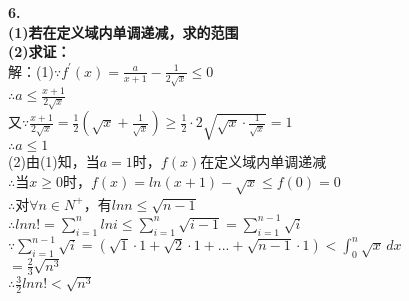 \documentclass{article}
\begin{document}
    \newpage
    \noindent \textbf{6. \\
    (1)若在定义域内单调递减，求的范围 \\
    (2)求证：} \\
    解：(1)\quad $\because $\quad $f^{'}(x)=\frac{a}{x+1}-\frac{1}{2\sqrt{x}}\leqslant 0$ \\
    $\therefore $\quad $a\leqslant \frac{x+1}{2\sqrt{x}}$ \\
    又$\because $\quad $\frac{x+1}{2\sqrt{x}}=\frac{1}{2}\left(\sqrt{x}+\frac{1}{\sqrt{x}}\right)\geqslant \frac{1}{2}\cdot 2\sqrt{\sqrt{x}\cdot\frac{1}{\sqrt{x}}}=1$ \\
    $\therefore $\quad $a\leqslant 1$ \\
    (2)由(1)知，当$a=1$时，$f(x)$在定义域内单调递减 \\
    $\therefore $\quad 当$x\geqslant 0$时，$f(x)=ln(x+1)-\sqrt{x}\leqslant f(0)=0$ \\
    $\therefore $\quad 对$\forall n\in N^+$，有$lnn\leqslant \sqrt{n-1}$ \\
    $\therefore $\quad $lnn!=\sum_{i = 1}^{n} lni\leqslant \sum_{i = 1}^{n} \sqrt{i-1}=\sum_{i = 1}^{n-1} \sqrt{i}$ \\
    $\because $\quad $\sum_{i = 1}^{n-1} \sqrt{i}=\left(\sqrt{1}\cdot 1+\sqrt{2}\cdot 1+...+\sqrt{n-1}\cdot 1\right)<\int_{0}^{n}\sqrt{x}\,dx$ \\
    \hspace*{11.4cm} $ =\frac{2}{3}\sqrt{n^3}$ \\
    $\therefore $\quad $\frac{3}{2}lnn!<\sqrt{n^3}$ \\
\end{document}

